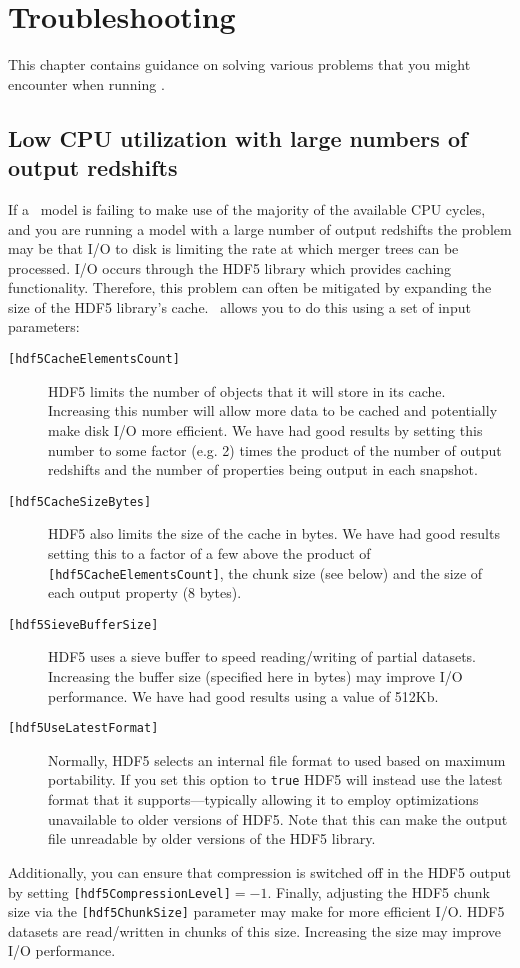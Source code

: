 \chapter{Troubleshooting}

This chapter contains guidance on solving various problems that you might encounter when running \glc.

\section{Low CPU utilization with large numbers of output redshifts}

If a \glc\ model is failing to make use of the majority of the available CPU cycles, and you are running a model with a large number of output redshifts the problem may be that I/O to disk is limiting the rate at which merger trees can be processed. I/O occurs through the HDF5 library which provides caching functionality. Therefore, this problem can often be mitigated by expanding the size of the HDF5 library's cache. \glc\ allows you to do this using a set of input parameters:
\begin{description}
\item[{\tt [hdf5CacheElementsCount]}] HDF5 limits the number of objects that it will store in its cache. Increasing this number will allow more data to be cached and potentially make disk I/O more efficient. We have had good results by setting this number to some factor (e.g. 2) times the product of the number of output redshifts and the number of properties being output in each snapshot.

\item[{\tt [hdf5CacheSizeBytes]}] HDF5 also limits the size of the cache in bytes. We have had good results setting this to a factor of a few above the product of {\tt [hdf5CacheElementsCount]}, the chunk size (see below) and the size of each output property (8 bytes).

\item[{\tt [hdf5SieveBufferSize]}] HDF5 uses a sieve buffer to speed reading/writing of partial datasets. Increasing the buffer size (specified here in bytes) may improve I/O performance. We have had good results using a value of 512Kb.

\item[{\tt [hdf5UseLatestFormat]}] Normally, HDF5 selects an internal file format to used based on maximum portability. If you set this option to {\tt true} HDF5 will instead use the latest format that it supports---typically allowing it to employ optimizations unavailable to older versions of HDF5. Note that this can make the output file unreadable by older versions of the HDF5 library.
\end{description}
Additionally, you can ensure that compression is switched off in the HDF5 output by setting {\tt [hdf5CompressionLevel]}$=-1$. Finally, adjusting the HDF5 chunk size via the {\tt [hdf5ChunkSize]} parameter may make for more efficient I/O. HDF5 datasets are read/written in chunks of this size. Increasing the size may improve I/O performance. 
